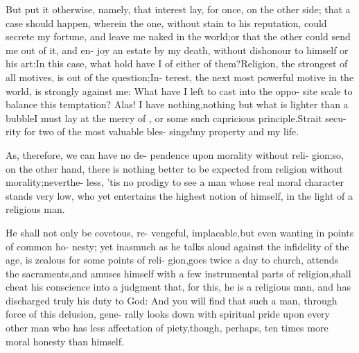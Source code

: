 \documentclass{article}
\begin{document}
\lqq But put it otherwise, namely, that\break
\lqq interest lay, for once, on the other side;\break
\lqq that a case should happen, wherein the\break
\lqq one, without stain to his reputation,\break
\lqq could secrete my fortune, and leave
\lqq me naked in the world;\tsk or that the\break
\lqq other could send me out of it, and en-\break
\lqq joy an estate by my death, without\break
\lqq dishonour to himself or his art:\tsk In\break
\lqq this case, what hold have I of either of\break
\lqq them?\tsk Religion, the strongest of all\break
\lqq motives, is out of the question;\tsk In-\break
\lqq terest, the next most powerful motive\break
\lqq in the world, is strongly against me:\tsk\break
\lqq What have I left to cast into the oppo-\break
\lqq site scale to balance this temptation?\tsk\break
\lqq Alas! I have nothing,\tsk nothing but\break
\lqq what is lighter than a bubble\tsk I must\break
\lqq lay at the mercy of , or some\break
\lqq such capricious principle.\tsk Strait secu-\break
\lqq rity for two of the most valuable bles-\break
\lqq sings!\tsk my property and my life.

\lqq As, therefore, we can have no de-\break
\lqq pendence upon morality without reli-\break
\lqq gion;\tsk so, on the other hand, there is
\lqq nothing better to be expected from\break
\lqq religion without morality;\tsk neverthe-\break
\lqq less, ’tis no prodigy to see a man whose\break
\lqq real moral character stands very low,\break
\lqq who yet entertains the highest notion\break
\lqq of himself, in the light of a religious\break
\lqq man.

\lqq He shall not only be covetous, re-\break
\lqq vengeful, implacable,\tsk but even\break
\lqq wanting in points of common ho-\break
\lqq nesty; yet inasmuch as he talks aloud\break
\lqq against the infidelity of the age,\tsh\break
\lqq is zealous for some points of reli-\break
\lqq gion,\tsh goes twice a day to church,\break
\lqq \tsh attends the sacraments,\tsh and\break
\lqq amuses himself with a few instrumental\break
\lqq parts of religion,\tsk shall cheat his\break
\lqq conscience into a judgment that, for\break
\lqq this, he is a religious man, and has\break
\lqq discharged truly his duty to God:
\lqq And you will find that such a man,\break
\lqq through force of this delusion, gene-\break
\lqq rally looks down with spiritual pride\break
\lqq upon every other man who has less\break
\lqq affectation of piety,\tsk though, perhaps,\break
\lqq ten times more moral honesty than\break
\lqq himself.
\end{document}
